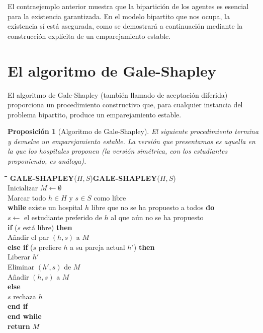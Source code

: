 \documentclass[12pt, spanish, oneside, openany]{book}
\newcommand{\pl}[1]{\makebox[1.6em][r]{\texttt{\footnotesize #1}}\hspace{0.9em}}
\newenvironment{pseudo}[1]{%
  \begin{center}%
  \begin{mdframed}[style=pseudobox]%
  \small
  \begin{tabbing}%
  \hspace{2.5em}\=\hspace{1.5em}\=\hspace{1.5em}\=\hspace{1.5em}\=\hspace{1.5em}\=\kill
  \def\pseudotitulo{#1}\ifx\pseudotitulo\empty\else#1\\[3pt]\fi}%
  {\end{tabbing}\end{mdframed}\end{center}}
\theoremstyle{uprightplain}
\newtheorem{proposicion}[teorema]{Proposición}
\theoremstyle{definition}
\theoremstyle{remark}
\theoremstyle{definition}
\begin{document}
El contraejemplo anterior muestra que la bipartición de los agentes es esencial para la existencia garantizada. En el modelo bipartito que nos ocupa, la existencia sí está asegurada, como se demostrará a continuación mediante la construcción explícita de un emparejamiento estable.


\section{El algoritmo de Gale-Shapley}

El algoritmo de Gale-Shapley (también llamado de aceptación diferida) proporciona un procedimiento constructivo que, para cualquier instancia del problema bipartito, produce un emparejamiento estable.

\begin{proposicion}[Algoritmo de Gale-Shapley]
\label{prop:gs}
El siguiente procedimiento termina y devuelve un emparejamiento estable. La versión que presentamos es aquella en la que los hospitales proponen (la versión simétrica, con los estudiantes proponiendo, es análoga).
\end{proposicion}

\begin{pseudo}{\textbf{GALE-SHAPLEY}($H,S$)}
\pl{1}\> Inicializar $M \leftarrow \emptyset$\\
\pl{2}\> Marcar todo $h \in H$ y $s \in S$ como libre\\
\pl{3}\> \textbf{while} existe un hospital $h$ libre que no se ha propuesto a todos \textbf{do}\\
\pl{4}\>\> $s \leftarrow$ el estudiante preferido de $h$ al que aún no se ha propuesto\\
\pl{5}\>\> \textbf{if} ($s$ está libre) \textbf{then}\\
\pl{6}\>\>\> Añadir el par $(h,s)$ a $M$\\
\pl{7}\>\> \textbf{else if} ($s$ prefiere $h$ a su pareja actual $h'$) \textbf{then}\\
\pl{8}\>\>\> Liberar $h'$\\
\pl{9}\>\>\> Eliminar $(h',s)$ de $M$\\
\pl{10}\>\>\> Añadir $(h,s)$ a $M$\\
\pl{11}\>\> \textbf{else}\\
\pl{12}\>\>\> $s$ rechaza $h$\\
\pl{13}\>\> \textbf{end if}\\
\pl{14}\> \textbf{end while}\\
\pl{15}\> \textbf{return} $M$
\end{pseudo}
\end{document}

